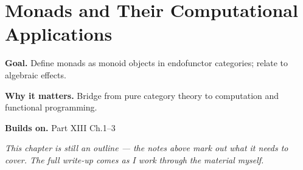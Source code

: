 \chapter{Monads and Their Computational Applications}
\label{ch:13-category-theory-and-universal-structures-05}

\begin{chapterintro}
\textbf{Goal.} Define monads as monoid objects in endofunctor categories; relate to algebraic effects.

\textbf{Why it matters.} Bridge from pure category theory to computation and functional programming.

\textbf{Builds on.} Part XIII Ch.1–3
\end{chapterintro}

\textit{This chapter is still an outline --- the notes above mark out what it needs to cover. The full write-up comes as I work through the material myself.}
